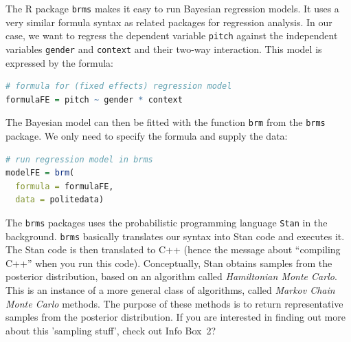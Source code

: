 \documentclass[nobib]{tufte-handout}
\begin{document}
The R package \texttt{brms} \citep{buerkner2016brms} makes it easy to run Bayesian regression models. It uses a very similar formula syntax as related packages for regression analysis. In our case, we want to regress the dependent variable \texttt{pitch} against the independent variables \texttt{gender} and \texttt{context} and their two-way interaction. This model is expressed by the formula:

\begin{minipage}[]{\textwidth}
\begin{lstlisting}[language=R]
# formula for (fixed effects) regression model
formulaFE = pitch ~ gender * context
\end{lstlisting}
\end{minipage}

The Bayesian model can then be fitted with the function \texttt{brm} from the \texttt{brms} package. We only need to specify the formula and supply the data:

\begin{minipage}[]{\textwidth}
\begin{lstlisting}[language=R]
# run regression model in brms
modelFE = brm(
  formula = formulaFE,
  data = politedata)
\end{lstlisting}
\end{minipage}

\noindent The \texttt{brms} packages uses the probabilistic programming language \texttt{Stan}
in the background. \texttt{brms} basically translates our syntax into Stan code and
executes it. The Stan code  is then translated to C++ (hence the message about ``compiling
C++'' when you run this code). Conceptually, Stan obtains samples from the posterior
distribution, based on an algorithm called \emph{Hamiltonian Monte Carlo}. This is an instance
of a more general class of algorithms, called \emph{Markov Chain Monte Carlo} methods. The
purpose of these methods is to return representative samples from the posterior distribution.
If you are interested in finding out more about this 'sampling stuff', check out Info Box~2?
\end{document}
